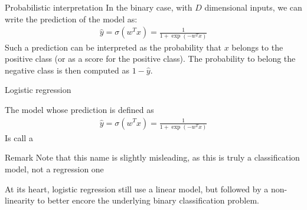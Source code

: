 \begin{parag}{Probabilistic interpretation}
    In the binary case, with $D$ dimensional inputs, we can write the prediction of the model as:
	\begin{align*} 
		\hat{y} =  \sigma\left(w^{T}x\right) = \frac{1}{1 + \exp\left(-w^{T}x\right)}
	\end{align*}
	Such a prediction can be interpreted as the probability that $x$ belongs to the positive class (or as a score for the positive class). The probability to belong the negative class is then computed as $1 - \hat{y}$.
\end{parag}
\begin{parag}{Logistic regression}
    \begin{definition}
    The model whose prediction is defined as 
	\begin{align*} 
		\hat{y} = \sigma\left(w^{T}x\right) = \frac{1}{1 + \exp\left(-w^{T}x\right)}
	\end{align*}
	Is call a 
    \end{definition}
	\begin{subparag}{Remark}
	    Note that this name is slightly misleading, as this is truly a classification model, not a regression one
	\end{subparag}
	At its heart, logistic regression still use a linear model, but followed by a non-linearity to better encore the underlying binary classification problem.
\end{parag}
